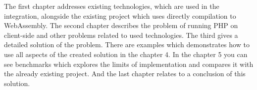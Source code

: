 The first chapter addresses existing technologies, which are used in the integration, alongside the existing project which uses directly compilation to WebAssembly.
The second chapter describes the problem of running PHP on client-side and other problems related to used technologies.
The third gives a detailed solution of the problem.
There are examples which demonstrates how to use all aspects of the created solution in the chapter 4.
In the chapter 5 you can see benchmarks which explores the limits of implementation and compares it with the already existing project.
And the last chapter relates to a conclusion of this solution. 